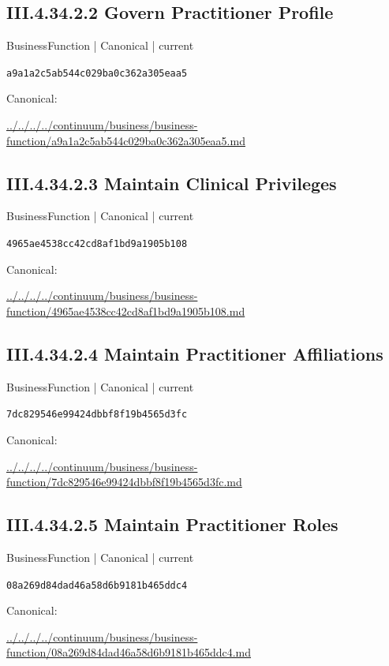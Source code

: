 \documentclass[10pt,a4paper]{article}
\begin{document}
\subsection*{III.4.34.2.2 Govern Practitioner Profile}
{\small BusinessFunction | Canonical | current}\par
\texttt{a9a1a2c5ab544c029ba0c362a305eaa5}\par
Canonical: \par
{\footnotesize\url{../../../../continuum/business/business-function/a9a1a2c5ab544c029ba0c362a305eaa5.md}}\par
\subsection*{III.4.34.2.3 Maintain Clinical Privileges}
{\small BusinessFunction | Canonical | current}\par
\texttt{4965ae4538cc42cd8af1bd9a1905b108}\par
Canonical: \par
{\footnotesize\url{../../../../continuum/business/business-function/4965ae4538cc42cd8af1bd9a1905b108.md}}\par
\subsection*{III.4.34.2.4 Maintain Practitioner Affiliations}
{\small BusinessFunction | Canonical | current}\par
\texttt{7dc829546e99424dbbf8f19b4565d3fc}\par
Canonical: \par
{\footnotesize\url{../../../../continuum/business/business-function/7dc829546e99424dbbf8f19b4565d3fc.md}}\par
\subsection*{III.4.34.2.5 Maintain Practitioner Roles}
{\small BusinessFunction | Canonical | current}\par
\texttt{08a269d84dad46a58d6b9181b465ddc4}\par
Canonical: \par
{\footnotesize\url{../../../../continuum/business/business-function/08a269d84dad46a58d6b9181b465ddc4.md}}\par
\end{document}
